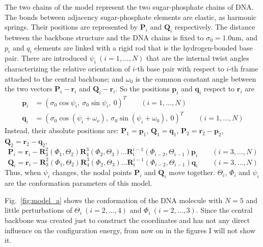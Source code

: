 \documentclass[a4paper,10pt]{article}
\begin{document}
The two chains of the model represent the two sugar-phosphate chains of DNA.
The bonds between adjacency sugar-phosphate elements are elastic, as harmonic springs.
Their positions are represented by $\textbf{P}_i$ and $\textbf{Q}_i$ respectively.
The distance between the backbone structure and the DNA chains is fixed to $\sigma_0=1.0$\si{\nm}, and $p_{i}$ and $q_{i}$ elements are linked with a rigid rod that is the hydrogen-bonded base pair.
There are introduced $\psi_i\ (i=1,\dots,N)$ that are the internal twist angles characterizing the relative orientation of $i$-th base pair with respect to $i$-th frame attached to the central backbone;
and $\omega_0$ is the common constant angle between the two vectors $\textbf{P}_i-\textbf{r}_i$ and $\textbf{Q}_i-\textbf{r}_i$.
So the positions $\textbf{p}_i$ and $\textbf{q}_i$ respect to $\textbf{r}_i$ are
\begin{equation}
\begin{split}
\textbf{p}_i & =\left(\sigma_0\cos\psi_i,\ \sigma_0\sin\psi_i,\ 0\right)^T \qquad (i=1,\dots,N) \\
\textbf{q}_i & =\left(\sigma_0\cos\left(\psi_i+\omega_o\right),\ \sigma_0\sin\left(\psi_i+\omega_0\right),\ 0\right)^T \qquad (i=1,\dots,N)
\end{split}
\end{equation}
Instead, their absolute positions are: $\textbf{P}_1=\textbf{p}_1$, $\textbf{Q}_1=\textbf{q}_1$, $\textbf{P}_2=\textbf{r}_2-\textbf{p}_2$, $\textbf{Q}_2=\textbf{r}_2-\textbf{q}_2$,
\begin{equation}
\textbf{P}_i=\textbf{r}_i-\textbf{R}^{2}_{3}\left(\Phi_1,\Theta_2\right)\textbf{R}^{3}_{4}\left(\Phi_2,\Theta_3\right)\dots\textbf{R}^{i-1}_{i}\left(\Phi_{i-2},\Theta_{i-1}\right)\textbf{p}_i\qquad (i=3,\dots,N)
\end{equation}
\begin{equation}
\textbf{Q}_i=\textbf{r}_i-\textbf{R}^{2}_{3}\left(\Phi_1,\Theta_2\right)\textbf{R}^{3}_{4}\left(\Phi_2,\Theta_3\right)\dots\textbf{R}^{i-1}_{i}\left(\Phi_{i-2},\Theta_{i-1}\right)\textbf{q}_i\qquad (i=3,\dots,N)
\end{equation}
Thus, when $\psi_i$ changes, the nodal points $\textbf{P}_i$ and $\textbf{Q}_i$ move together.
$\Theta_i$, $\Phi_i$ and $\psi_i$ are the conformation parameters of this model.

Fig.~\ref{fig:model_a} shows the conformation of the DNA molecule with $N=5$ and little perturbations of $\Theta_{i}\ \left (i = 2,\dots,4\right )$ and $\Phi_{i}\ \left (i = 2,\dots,3\right )$.
Since the central backbone was created just to construct the coordinates and has not any direct influence on the configuration energy, from now on in the figures I will not show it.
\end{document}
